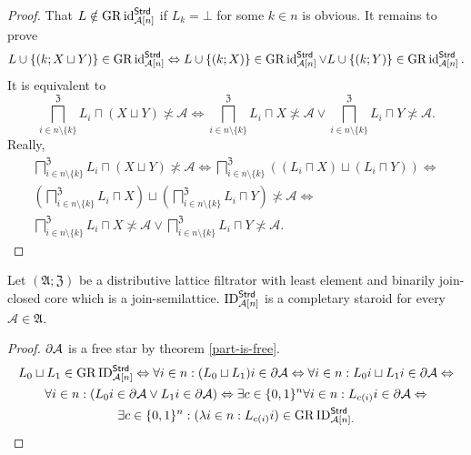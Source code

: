 \begin{proof}
That $L\notin\operatorname{GR}\operatorname{id}_{\mathcal{A}[n]}^{\mathsf{Strd}}$ if $L_{k}=\bot$
for some $k\in n$ is obvious. It remains to prove 
\[
L\cup\{(k;X\sqcup Y)\}\in\operatorname{GR}\operatorname{id}_{\mathcal{A}[n]}^{\mathsf{Strd}}\Leftrightarrow L\cup\{(k;X)\}\in\operatorname{GR}\operatorname{id}_{\mathcal{A}[n]}^{\mathsf{Strd}}\vee L\cup\{(k;Y)\}\in\operatorname{GR}\operatorname{id}_{\mathcal{A}[n]}^{\mathsf{Strd}}.
\]
It is equivalent to 
\[
\bigsqcap_{i\in n\setminus\{k\}}^{\mathfrak{Z}}L_{i}\sqcap(X\sqcup Y)\nasymp\mathcal{A}\Leftrightarrow\bigsqcap_{i\in n\setminus\{k\}}^{\mathfrak{Z}}L_{i}\sqcap X\nasymp\mathcal{A}\vee\bigsqcap_{i\in n\setminus\{k\}}^{\mathfrak{Z}}L_{i}\sqcap Y\nasymp\mathcal{A}.
\]
Really,
\begin{multline*}
\bigsqcap_{i\in n\setminus\{k\}}^{\mathfrak{Z}}L_{i}\sqcap(X\sqcup Y)\nasymp\mathcal{A}\Leftrightarrow
\bigsqcap_{i\in n\setminus\{k\}}^{\mathfrak{Z}}((L_{i}\sqcap X)\sqcup(L_{i}\sqcap Y))\Leftrightarrow \\
\left(\bigsqcap_{i\in n\setminus\{k\}}^{\mathfrak{Z}}L_{i}\sqcap X\right)\sqcup\left(\bigsqcap_{i\in n\setminus\{k\}}^{\mathfrak{Z}}L_{i}\sqcap Y\right)\nasymp\mathcal{A}\Leftrightarrow\\
\bigsqcap_{i\in n\setminus\{k\}}^{\mathfrak{Z}}L_{i}\sqcap X\nasymp\mathcal{A}\vee\bigsqcap_{i\in n\setminus\{k\}}^{\mathfrak{Z}}L_{i}\sqcap Y\nasymp\mathcal{A}.
\end{multline*}
\end{proof}
\begin{prop}
\label{ID-completary}Let $(\mathfrak{A};\mathfrak{Z})$ be a distributive
lattice filtrator with least element and binarily join-closed core
which is a join-semilattice. $\operatorname{ID}_{\mathcal{A}[n]}^{\mathsf{Strd}}$
is a completary staroid for every $\mathcal{A}\in\mathfrak{A}$.\end{prop}
\begin{proof}
$\partial\mathcal{A}$ is a free star by theorem \ref{part-is-free}.
\begin{multline*}
L_{0}\sqcup L_{1}\in\operatorname{GR}\operatorname{ID}_{\mathcal{A}[n]}^{\mathsf{Strd}}\Leftrightarrow\forall i\in n:(L_{0}\sqcup L_{1})i\in\partial\mathcal{A}\Leftrightarrow\forall i\in n:L_{0}i\sqcup L_{1}i\in\partial\mathcal{A}\Leftrightarrow\\
\forall i\in n:(L_{0}i\in\partial\mathcal{A}\vee L_{1}i\in\partial\mathcal{A})\Leftrightarrow\exists c\in\{0,1\}^{n}\forall i\in n:L_{c(i)}i\in\partial\mathcal{A}\Leftrightarrow\\
\exists c\in\{0,1\}^{n}:(\lambda i\in n:L_{c(i)}i)\in\operatorname{GR}\operatorname{ID}_{\mathcal{A}[n].}^{\mathsf{Strd}}
\end{multline*}
\end{proof}
